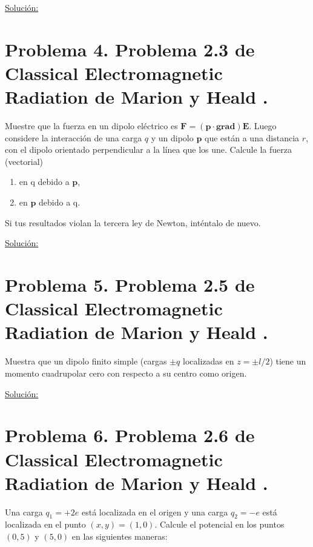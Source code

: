 \documentclass[a4paper,11pt]{article}
\numberwithin{equation}{section}
\begin{document}
\vspace{.3cm}

\underline{Solución:} \vspace{.3cm}

\section{Problema 4. Problema 2.3 de Classical Electromagnetic Radiation
de Marion y Heald \cite{marion2}.}

Muestre que la fuerza en un dipolo eléctrico es $\mathbf{F} = (\mathbf{p}\cdot 
\mathbf{grad})\mathbf{E}$. Luego considere la interacción de una carga $q$ y un dipolo 
$\mathbf{p}$ que están a una distancia $r$, con el dipolo orientado perpendicular a 
la línea que los une. Calcule la fuerza (vectorial)

\begin{enumerate}[label=\textbf{(\alph*)}]
\item en q debido a $\mathbf{p}$, 
\item en $\mathbf{p}$ debido a q.
\end{enumerate}

Si tus resultados violan la tercera ley de Newton, inténtalo de nuevo.

\vspace{.3cm}

\underline{Solución:} \vspace{.3cm}

\section{Problema 5. Problema 2.5 de Classical Electromagnetic Radiation
de Marion y Heald \cite{marion2}.}

Muestra que un dipolo finito simple (cargas $\pm q$ localizadas en $z = \pm l/2$) 
tiene un momento cuadrupolar cero con respecto a su centro como origen.

\vspace{.3cm}

\underline{Solución:} \vspace{.3cm}

\section{Problema 6. Problema 2.6 de Classical Electromagnetic Radiation
de Marion y Heald \cite{marion2}.}

Una carga $q_1 = + 2e$ está localizada en el origen y una carga $q_2 = - e$ está 
localizada en el punto $(x,y) = (1,0)$. Calcule el potencial en los puntos $(0,5)$
y $(5,0)$ en las siguientes maneras:
\end{document}

